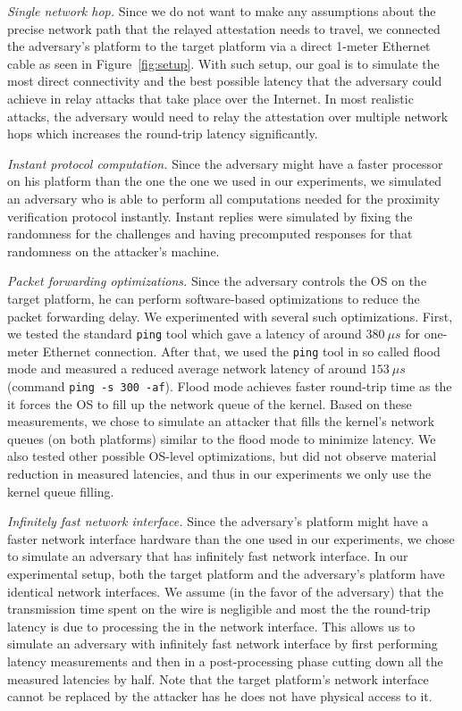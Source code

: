 \begin{mylist}
	\item \emph{Single network hop.} Since we do not want to make any assumptions about the precise network path that the relayed attestation needs to travel, we connected the adversary's platform to the target platform via a direct 1-meter Ethernet cable as seen in Figure~\ref{fig:setup}. With such setup, our goal is to simulate the most direct connectivity and the best possible latency that the adversary could achieve in relay attacks that take place over the Internet. In most realistic attacks, the adversary would need to relay the attestation over multiple network hops which increases the round-trip latency significantly. 

	\item \emph{Instant protocol computation.} Since the adversary might have a faster processor on his platform than the one the one we used in our experiments, we simulated an adversary who is able to perform all computations needed for the proximity verification protocol instantly. Instant replies were simulated by fixing the randomness for the challenges and having precomputed responses for that randomness on the attacker's machine.

	\item \emph{Packet forwarding optimizations.} Since the adversary controls the OS on the target platform, he can perform software-based optimizations to reduce the packet forwarding delay. We experimented with several such optimizations. First, we tested the standard \texttt{ping} tool which gave a latency of around $380\ \mu s$ for one-meter Ethernet connection. After that, we used the \texttt{ping} tool in so called flood mode and measured a reduced average network latency of around $153\ \mu s$ (command \texttt{ping -s 300 -af}). Flood mode achieves faster round-trip time as the it forces the OS to fill up the network queue of the kernel. Based on these measurements, we chose to simulate an attacker that fills the kernel's network queues (on both platforms) similar to the flood mode to minimize latency. We also tested other possible OS-level optimizations, but did not observe material reduction in measured latencies, and thus in our experiments we only use the kernel queue filling.
	
	\item \emph{Infinitely fast network interface.} Since the adversary's platform might have a faster network interface hardware than the one used in our experiments, we chose to simulate an adversary that has infinitely fast network interface. In our experimental setup, both the target platform and the adversary's platform have identical network interfaces. We assume (in the favor of the adversary) that the transmission time spent on the wire is negligible and most the the round-trip latency is due to processing the in the network interface. This allows us to simulate an adversary with infinitely fast network interface by first performing latency measurements and then in a post-processing phase cutting down all the measured latencies by half. Note that the target platform's network interface cannot be replaced by the attacker has he does not have physical access to it.
\end{mylist}


